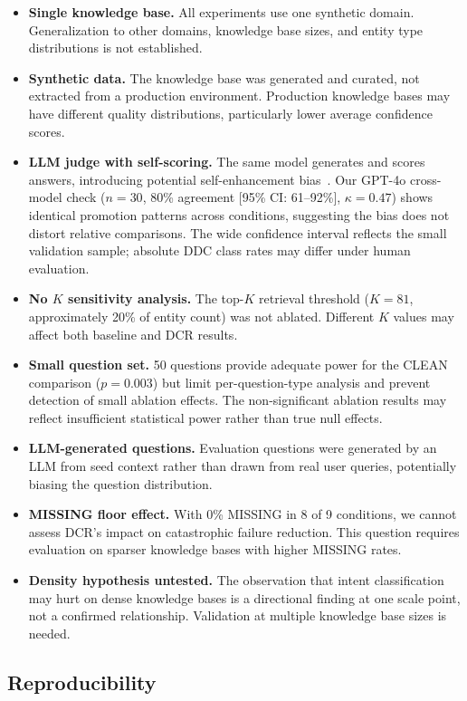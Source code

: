 \documentclass[11pt,a4paper]{article}
\begin{document}
\begin{itemize}[nosep]
  \item \textbf{Single knowledge base.} All experiments use one synthetic domain. Generalization to other domains, knowledge base sizes, and entity type distributions is not established.
  \item \textbf{Synthetic data.} The knowledge base was generated and curated, not extracted from a production environment. Production knowledge bases may have different quality distributions, particularly lower average confidence scores.
  \item \textbf{LLM judge with self-scoring.} The same model generates and scores answers, introducing potential self-enhancement bias~\citep{zheng2023judging}. Our GPT-4o cross-model check ($n = 30$, 80\% agreement [95\% CI: 61--92\%], $\kappa = 0.47$) shows identical promotion patterns across conditions, suggesting the bias does not distort relative comparisons. The wide confidence interval reflects the small validation sample; absolute DDC class rates may differ under human evaluation.
  \item \textbf{No $K$ sensitivity analysis.} The top-$K$ retrieval threshold ($K = 81$, approximately 20\% of entity count) was not ablated. Different $K$ values may affect both baseline and DCR results.
  \item \textbf{Small question set.} 50 questions provide adequate power for the CLEAN comparison ($p = 0.003$) but limit per-question-type analysis and prevent detection of small ablation effects. The non-significant ablation results may reflect insufficient statistical power rather than true null effects.
  \item \textbf{LLM-generated questions.} Evaluation questions were generated by an LLM from seed context rather than drawn from real user queries, potentially biasing the question distribution.
  \item \textbf{MISSING floor effect.} With 0\% MISSING in 8 of 9 conditions, we cannot assess DCR's impact on catastrophic failure reduction. This question requires evaluation on sparser knowledge bases with higher MISSING rates.
  \item \textbf{Density hypothesis untested.} The observation that intent classification may hurt on dense knowledge bases is a directional finding at one scale point, not a confirmed relationship. Validation at multiple knowledge base sizes is needed.
\end{itemize}

\subsection{Reproducibility}
\end{document}
